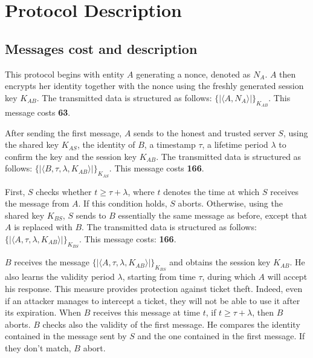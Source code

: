\section{Protocol Description}

\subsection{Messages cost and description}



This protocol begins with entity $A$ generating a nonce, denoted as $N_A$. $A$ then encrypts her identity together
with the nonce using the freshly generated session key $K_{AB}$. The transmitted data is structured as follows:
$\{| \langle A,N_A \rangle |\}_{K_{AB}}$. This message costs \textbf{63}.

\vspace{1cm}

After sending the first message, $A$ sends to the honest and trusted server $S$, using the shared key $K_{AS}$,
the identity of $B$, a timestamp $\tau$, a lifetime period $\lambda$ to confirm the key and the session key $K_{AB}$.
The transmitted data is structured as follows: $\{| \langle B, \tau, \lambda, K_{AB} \rangle |\}_{K_{AS}}$. This message costs \textbf{166}.

\vspace{1cm}

First, $S$ checks whether $t \geq \tau + \lambda$, where $t$ denotes the time at which $S$ receives the message from
$A$. If this condition holds, $S$ aborts. Otherwise, using the shared key $K_{BS}$, $S$ sends to $B$ essentially the
same message as before, except that $A$ is replaced with $B$. The transmitted data is structured as follows:
$\{| \langle A, \tau, \lambda, K_{AB} \rangle |\}_{K_{BS}}$. This message costs: \textbf{166}.

\vspace{1cm}

$B$ receives the message $\{| \langle A, \tau, \lambda, K_{AB} \rangle |\}_{K_{BS}}$ and obtains the session key $K_{AB}$.
He also learns the validity period $\lambda$, starting from time $\tau$, during which $A$ will accept his response.
This measure provides protection against ticket theft. Indeed, even if an attacker manages to intercept a ticket,
they will not be able to use it after its expiration. When $B$ receives this message at time $t$, if
$t \geq \tau + \lambda$, then $B$ aborts. $B$ checks also the validity of the first message. He compares the identity contained in
the message sent by $S$ and the one contained in the first message. If they don't match, $B$ abort.

